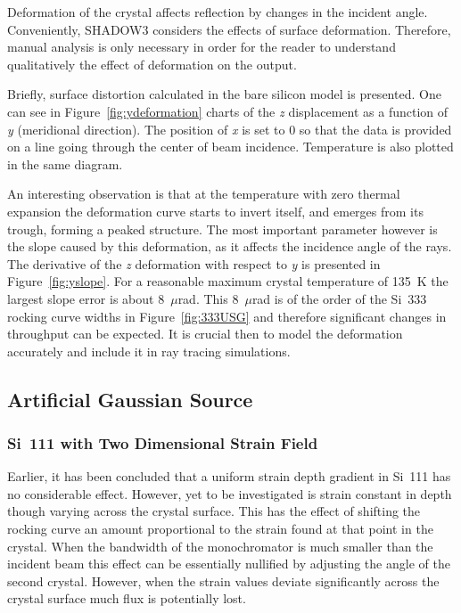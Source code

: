 \documentclass[preprint]{iucr}              %
\begin{document}
Deformation of the crystal affects reflection by changes in the incident angle. Conveniently, SHADOW3 considers the effects of surface deformation. Therefore, manual analysis is only necessary in order for the reader to understand qualitatively the effect of deformation on the output.

Briefly, surface distortion calculated in the bare silicon model is presented. One can see in Figure~\ref{fig:ydeformation} charts of the \textit{z} displacement as a function of \textit{y} (meridional direction). The position of \textit{x} is set to 0 so that the data is provided on a line going through the center of beam incidence. Temperature is also plotted in the same diagram.

An interesting observation is that at the temperature with zero thermal expansion the deformation curve starts to invert itself, and emerges from its trough, forming a peaked structure. The most important parameter however is the slope caused by this deformation, as it affects the incidence angle of the rays. The derivative of the \textit{z} deformation with respect to \textit{y} is presented in Figure~\ref{fig:yslope}. For a reasonable maximum crystal temperature of 135~K the largest slope error is about 8~$\mu$rad. This 8~$\mu$rad is of the order of the Si~333 rocking curve widths in Figure~\ref{fig:333USG} and therefore significant changes in throughput can be expected. It is crucial then to model the deformation accurately and include it in ray tracing simulations.

\subsection{Artificial Gaussian Source}\label{gaussian}
\subsubsection{Si~111 with Two Dimensional Strain Field}\label{111simulation}
Earlier, it has been concluded that a uniform strain depth gradient in Si~111 has no considerable effect. However, yet to be investigated is strain constant in depth though varying across the crystal surface. This has the effect of shifting the rocking curve an amount proportional to the strain found at that point in the crystal. When the bandwidth of the monochromator is much smaller than the incident beam this effect can be essentially nullified by adjusting the angle of the second crystal. However, when the strain values deviate significantly across the crystal surface much flux is potentially lost.
\end{document}

